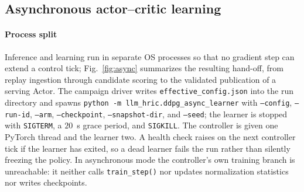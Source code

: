 \subsection{Asynchronous actor--critic learning}
\label{subsec:ctl-learner}
\paragraph*{Process split}
Inference and learning run in separate OS processes so that no gradient step can extend a control tick; Fig.~\ref{fig:async} summarizes the resulting hand-off, from replay ingestion through candidate scoring to the validated publication of a serving Actor. The campaign driver writes \texttt{effective\_config.json} into the run directory and spawns \texttt{python -m llm\_hric.ddpg\_async\_learner} with \texttt{--config}, \texttt{--run-id}, \texttt{--arm}, \texttt{--checkpoint}, \texttt{--snapshot-dir}, and \texttt{--seed}; the learner is stopped with \texttt{SIGTERM}, a $20$~s grace period, and \texttt{SIGKILL}. The controller is given one PyTorch thread and the learner two. A health check raises on the next controller tick if the learner has exited, so a dead learner fails the run rather than silently freezing the policy. In asynchronous mode the controller's own training branch is unreachable: it neither calls \texttt{train\_step()} nor updates normalization statistics nor writes checkpoints.


